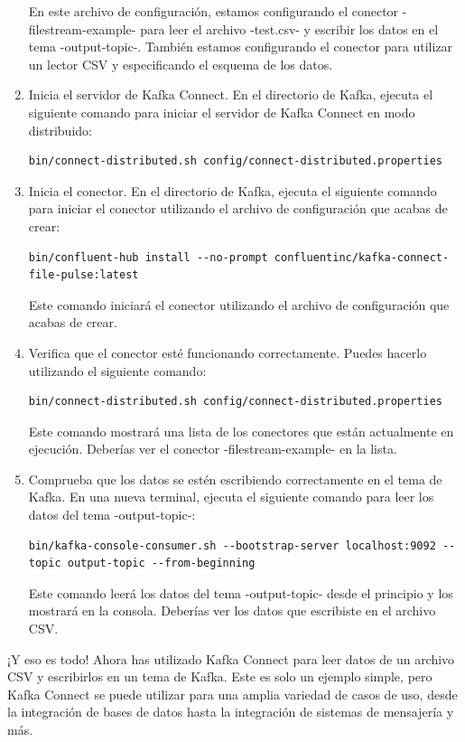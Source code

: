 \documentclass{article}
\begin{document}
\begin{enumerate}
En este archivo de configuración, estamos configurando el conector -filestream-example- para leer el archivo -test.csv- y escribir los datos en el tema -output-topic-. También estamos configurando el conector para utilizar un lector CSV y especificando el esquema de los datos.

\item Inicia el servidor de Kafka Connect. En el directorio de Kafka, ejecuta el siguiente comando para iniciar el servidor de Kafka Connect en modo distribuido:
\begin{lstlisting}[numbers=none]
bin/connect-distributed.sh config/connect-distributed.properties
\end{lstlisting}

\item Inicia el conector. En el directorio de Kafka, ejecuta el siguiente comando para iniciar el conector utilizando el archivo de configuración que acabas de crear:
\begin{lstlisting}[numbers=none]
bin/confluent-hub install --no-prompt confluentinc/kafka-connect-file-pulse:latest
\end{lstlisting}
Este comando iniciará el conector utilizando el archivo de configuración que acabas de crear.

\item Verifica que el conector esté funcionando correctamente. Puedes hacerlo utilizando el siguiente comando:
\begin{lstlisting}[numbers=none]
bin/connect-distributed.sh config/connect-distributed.properties
\end{lstlisting}
Este comando mostrará una lista de los conectores que están actualmente en ejecución. Deberías ver el conector -filestream-example- en la lista.

\item Comprueba que los datos se estén escribiendo correctamente en el tema de Kafka. En una nueva terminal, ejecuta el siguiente comando para leer los datos del tema -output-topic-:
\begin{lstlisting}[numbers=none]
bin/kafka-console-consumer.sh --bootstrap-server localhost:9092 --topic output-topic --from-beginning
\end{lstlisting}
Este comando leerá los datos del tema -output-topic- desde el principio y los mostrará en la consola. Deberías ver los datos que escribiste en el archivo CSV.
\end{enumerate}

¡Y eso es todo! Ahora has utilizado Kafka Connect para leer datos de un archivo CSV y escribirlos en un tema de Kafka. Este es solo un ejemplo simple, pero Kafka Connect se puede utilizar para una amplia variedad de casos de uso, desde la integración de bases de datos hasta la integración de sistemas de mensajería y más.
\end{document}
